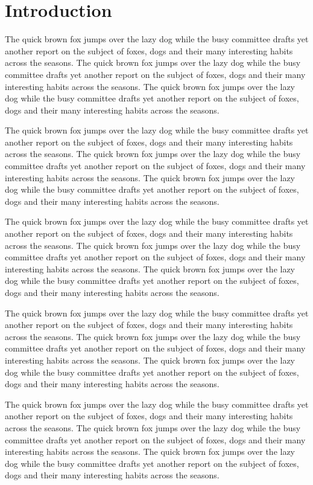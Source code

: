\documentclass{article}
\begin{document}
\tableofcontents

\section{Introduction}\label{sec1}
The quick brown fox jumps over the lazy dog while the busy committee drafts yet another report on the subject of foxes, dogs and their many interesting habits across the seasons. The quick brown fox jumps over the lazy dog while the busy committee drafts yet another report on the subject of foxes, dogs and their many interesting habits across the seasons. The quick brown fox jumps over the lazy dog while the busy committee drafts yet another report on the subject of foxes, dogs and their many interesting habits across the seasons. 

The quick brown fox jumps over the lazy dog while the busy committee drafts yet another report on the subject of foxes, dogs and their many interesting habits across the seasons. The quick brown fox jumps over the lazy dog while the busy committee drafts yet another report on the subject of foxes, dogs and their many interesting habits across the seasons. The quick brown fox jumps over the lazy dog while the busy committee drafts yet another report on the subject of foxes, dogs and their many interesting habits across the seasons. 

The quick brown fox jumps over the lazy dog while the busy committee drafts yet another report on the subject of foxes, dogs and their many interesting habits across the seasons. The quick brown fox jumps over the lazy dog while the busy committee drafts yet another report on the subject of foxes, dogs and their many interesting habits across the seasons. The quick brown fox jumps over the lazy dog while the busy committee drafts yet another report on the subject of foxes, dogs and their many interesting habits across the seasons. 

The quick brown fox jumps over the lazy dog while the busy committee drafts yet another report on the subject of foxes, dogs and their many interesting habits across the seasons. The quick brown fox jumps over the lazy dog while the busy committee drafts yet another report on the subject of foxes, dogs and their many interesting habits across the seasons. The quick brown fox jumps over the lazy dog while the busy committee drafts yet another report on the subject of foxes, dogs and their many interesting habits across the seasons. 

The quick brown fox jumps over the lazy dog while the busy committee drafts yet another report on the subject of foxes, dogs and their many interesting habits across the seasons. The quick brown fox jumps over the lazy dog while the busy committee drafts yet another report on the subject of foxes, dogs and their many interesting habits across the seasons. The quick brown fox jumps over the lazy dog while the busy committee drafts yet another report on the subject of foxes, dogs and their many interesting habits across the seasons. 
\end{document}
